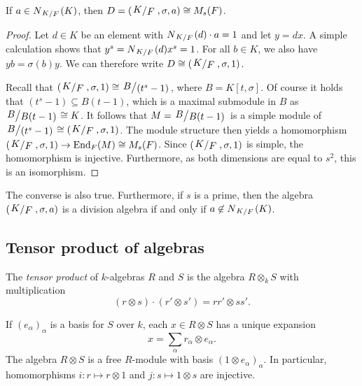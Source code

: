 \begin{izrek}
If $a \in N_{\kvoc{K}{F}}(K)$, then
$D = \br{\kvoc{K}{F}, \sigma, a} \cong M_s(F)$.
\end{izrek}

\begin{proof}
Let $d \in K$ be an element with $N_{\kvoc{K}{F}}(d) \cdot a = 1$
and let $y = dx$. A simple calculation shows that
$y^s = N_{\kvoc{K}{F}}(d) x^s = 1$. For all $b \in K$, we also have
$yb = \sigma(b) y$. We can therefore write
$D \cong \br{\kvoc{K}{F}, \sigma, 1}$.

Recall that
$\br{\kvoc{K}{F}, \sigma, 1} \cong \kvoc{B}{(t^s-1)}$, where
$B = K[t, \sigma]$. Of course it holds that
$(t^s-1) \subseteq B(t-1)$, which is a maximal submodule in $B$ as
$\kvoc{B}{B(t-1)} \cong K$. It follows that $M = \kvoc{B}{B(t-1)}$
is a simple module of
$\kvoc{B}{(t^s-1)} \cong  \br{\kvoc{K}{F}, \sigma, 1}$. The module
structure then yields a homomorphism
$\br{\kvoc{K}{F}, \sigma, 1} \to \End_F(M) \cong M_s(F)$. Since
$\br{\kvoc{K}{F}, \sigma, 1}$ is simple, the homomorphism is
injective. Furthermore, as both dimensions are equal to $s^2$, this
is an isomorphism.
\end{proof}

\begin{opomba}
The converse is also true. Furthermore, if $s$ is a prime, then the
algebra $\br{\kvoc{K}{F}, \sigma, a}$ is a division algebra if and
only if $a \not \in N_{\kvoc{K}{F}}(K)$.
\end{opomba}

\newpage

\subsection{Tensor product of algebras}

\begin{definicija}
The \emph{tensor product} of $k$-algebras $R$
and $S$ is the algebra $R \otimes_k S$ with multiplication
\[
(r \otimes s) \cdot (r' \otimes s') = rr' \otimes ss'.
\]
\end{definicija}

\begin{opomba}
If $(e_\alpha)_\alpha$ is a basis for $S$ over $k$, each
$x \in R \otimes S$ has a unique expansion
\[
x = \sum_{\alpha} r_\alpha \otimes e_\alpha.
\]
The algebra $R \otimes S$ is a free $R$-module with basis
$(1 \otimes e_\alpha)_\alpha$. In particular, homomorphisms
$i \colon r \mapsto r \otimes 1$ and
$j \colon s \mapsto 1 \otimes s$ are injective.
\end{opomba}


